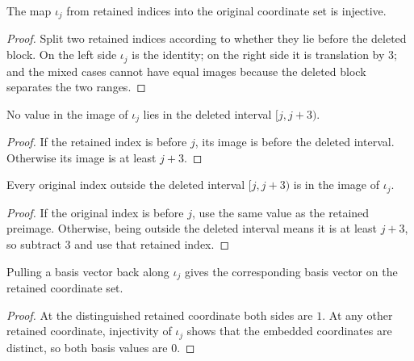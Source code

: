 \begin{lemma}

  \label{lem:deleteIndex_injective}
  The map \(\iota_j\) from retained indices into the original coordinate
  set is injective.
\end{lemma}
\begin{proof}

\leanok
  Split two retained indices according to whether they lie before the
  deleted block.  On the left side \(\iota_j\) is the identity; on the
  right side it is translation by \(3\); and the mixed cases cannot have
  equal images because the deleted block separates the two ranges.
\end{proof}

\begin{lemma}

  \label{lem:deleteIndex_not_deleted}
  No value in the image of \(\iota_j\) lies in the deleted interval
  \([j,j+3)\).
\end{lemma}
\begin{proof}

\leanok
  If the retained index is before \(j\), its image is before the deleted
  interval.  Otherwise its image is at least \(j+3\).
\end{proof}

\begin{lemma}

  \label{lem:deleteIndex_preimage_of_not_deleted}
  Every original index outside the deleted interval \([j,j+3)\) is in
  the image of \(\iota_j\).
\end{lemma}
\begin{proof}

\leanok
  If the original index is before \(j\), use the same value as the
  retained preimage.  Otherwise, being outside the deleted interval means
  it is at least \(j+3\), so subtract \(3\) and use that retained index.
\end{proof}

\begin{lemma}

  \label{lem:basis_deleteIndex}
  Pulling a basis vector back along \(\iota_j\) gives the corresponding
  basis vector on the retained coordinate set.
\end{lemma}
\begin{proof}

\leanok
  At the distinguished retained coordinate both sides are \(1\).  At any
  other retained coordinate, injectivity of \(\iota_j\) shows that the
  embedded coordinates are distinct, so both basis values are \(0\).
\end{proof}

